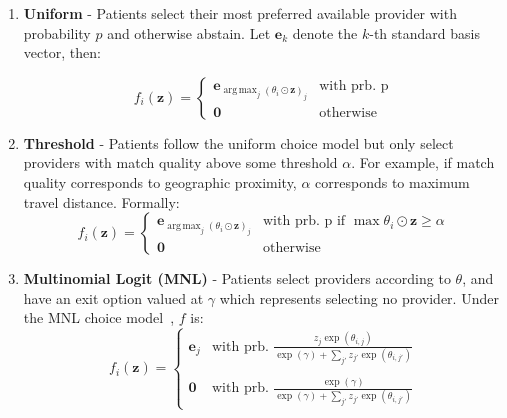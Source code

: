 \documentclass[11pt]{article}
\DeclareMathOperator*{\argmax}{arg\,max}
\begin{document}
\begin{enumerate}
    \item \textbf{Uniform} - Patients select their most preferred available provider with probability $p$ and otherwise abstain. 
    Let $\mathbf{e}_{k}$ denote the $k$-th standard basis vector, then: 
    
    \begin{equation}
    f_{i}(\mathbf{z}) =\left\{ \begin{array}{ll}
                \mathbf{e}_{\argmax_{j} (\theta_{i} \odot \mathbf{z})_{j}} & \text{with prb. p}\\
                \mathbf{0} &\text{otherwise}
            \end{array} \right.
    \end{equation}

    \item \textbf{Threshold} - Patients follow the uniform choice model but only select providers with match quality above some threshold $\alpha$. For example, if match quality corresponds to geographic proximity, $\alpha$ corresponds to maximum travel distance. 
Formally: 
    {\small \begin{equation}
    f_{i}(\mathbf{z}) =\left\{ \begin{array}{ll}
                \mathbf{e}_{\argmax_{j} (\theta_{i} \odot \mathbf{z})_{j}} & \text{with prb. p if } \max \theta_{i} \odot \mathbf{z} \geq \alpha \\
                \mathbf{0} &\text{otherwise}
            \end{array} \right.
    \end{equation}}
    \item \textbf{Multinomial Logit (MNL)} - Patients select providers according to $\theta$, and have an exit option valued at $\gamma$ which represents selecting no provider. Under the MNL choice model~\citep{choice_models_textbook}, $f$ is:
    \begin{equation}
            f_{i}(\mathbf{z}) =\left\{ \begin{array}{ll}
                \mathbf{e}_{j} & \text{with prb. } \frac{z_{j}\exp(\theta_{i,j})}{\exp(\gamma) + \sum_{j'} z_{j'} \exp(\theta_{i,j'})}\\\\
                \mathbf{0} &\text{with prb. } \frac{\exp(\gamma)} {\exp(\gamma) + \sum_{j'} z_{j'} \exp(\theta_{i,j'})}
            \end{array} \right.
    \end{equation}
\end{enumerate}
\end{document}
